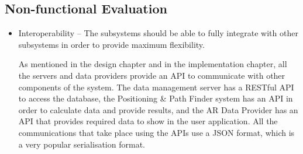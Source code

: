 \subsection{Non-functional Evaluation}
\begin{itemize}
    \item Interoperability – The subsystems should be able to fully integrate with other subsystems in order to provide maximum flexibility.
    
    As mentioned in the design chapter and in the implementation chapter, all the servers and data providers provide an API to communicate with other components of the system. The data management server has a RESTful API to access the database, the Positioning \& Path Finder system has an API in order to calculate data and provide results, and the AR Data Provider has an API that provides required data to show in the user application. All the communications that take place using the APIs use a JSON format, which is a very popular serialisation format.
    

\end{itemize}
